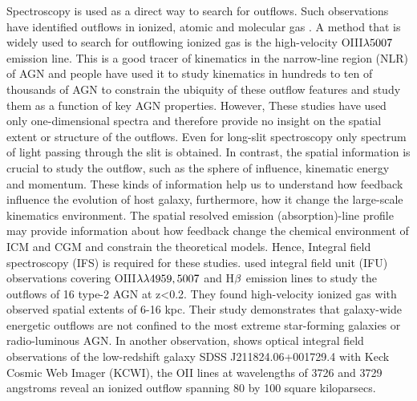 \documentclass[../main.tex]{subfiles}
\begin{document}


Spectroscopy is used as a direct way to search for outflows. Such observations have identified outflows in ionized, atomic and molecular gas \citep{nesvadba2008evidence}. A method that is widely used to search for outflowing ionized gas is the high-velocity OIII$\rm \lambda5007$ emission line. This is a good tracer of kinematics in the narrow-line region (NLR) of AGN and people have used it to study kinematics in hundreds to ten of thousands of AGN \citep{wang2011evolution,mullaney2013narrow} to constrain the ubiquity of these outflow features and study them as a function of key AGN properties. 
However, These studies have used only one-dimensional spectra and therefore provide no insight on the spatial extent or structure of the outflows. Even for long-slit spectroscopy only spectrum of light passing through the slit is obtained. In contrast, the spatial information is crucial to study the outflow, such as the sphere of influence, kinematic energy and momentum. These kinds of information help us to understand how feedback influence the evolution of host galaxy, furthermore, how it change the large-scale kinematics environment. The spatial resolved emission (absorption)-line profile may provide information about how feedback change the chemical environment of ICM and CGM and constrain the theoretical models. Hence, Integral field spectroscopy (IFS) is required for these studies. \citet{harrison2014kiloparsec} used integral field unit (IFU) observations covering OIII$\rm \lambda \lambda 4959,5007$ and H$\rm \beta$ emission lines to study the outflows of 16 type-2 AGN at z<0.2. They found high-velocity ionized gas with observed spatial extents of 6-16 kpc. Their study demonstrates that galaxy-wide energetic outflows are not confined to the most extreme star-forming galaxies or radio-luminous AGN. In another observation, \citet{rupke2019100} shows optical integral field observations of the low-redshift galaxy SDSS J211824.06+001729.4 with Keck Cosmic Web Imager (KCWI), the OII lines at wavelengths of 3726 and 3729 angstroms reveal an ionized outflow spanning 80 by 100 square kiloparsecs. 
\end{document}
